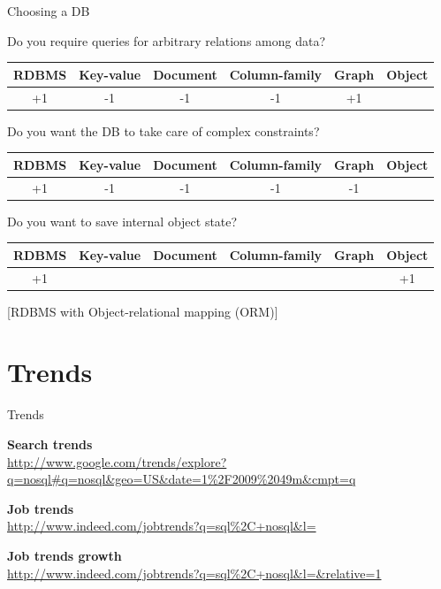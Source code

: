 \documentclass{beamer}
\begin{document}
\begin{frame}{Choosing a DB}

Do you require queries for arbitrary relations among data?

{\small
\begin{center}
\begin{tabular}{c|c|c|c|c|c}
RDBMS & Key-value & Document & Column-family & Graph & Object \\
\hline
+1 & -1 & -1 & -1 & +1 & \\
\end{tabular}
\end{center}
}

Do you want the DB to take care of complex constraints?

{\small
\begin{center}
\begin{tabular}{c|c|c|c|c|c}
RDBMS & Key-value & Document & Column-family & Graph & Object \\
\hline
+1 & -1 & -1 & -1 & -1 & \\
\end{tabular}
\end{center}
}

Do you want to save internal object state?

{\small
\begin{center}
\begin{tabular}{c|c|c|c|c|c}
RDBMS & Key-value & Document & Column-family & Graph & Object \\
\hline
+1 &  &  &  &  & +1 \\
\end{tabular}
\end{center}
}
{\footnotesize [RDBMS with Object-relational mapping (ORM)]}

\end{frame}

\section{Trends}

\begin{frame}[fragile]{Trends}


\textbf{Search trends}\\
\url{http://www.google.com/trends/explore?q=nosql#q=nosql&geo=US&date=1\%2F2009\%2049m&cmpt=q}

\vskip 0.25in

\textbf{Job trends}\\
\url{http://www.indeed.com/jobtrends?q=sql\%2C+nosql\&l=}

\vskip 0.25in

\textbf{Job trends growth}\\
\url{http://www.indeed.com/jobtrends?q=sql\%2C+nosql\&l=\&relative=1}

\end{frame}
\end{document}
